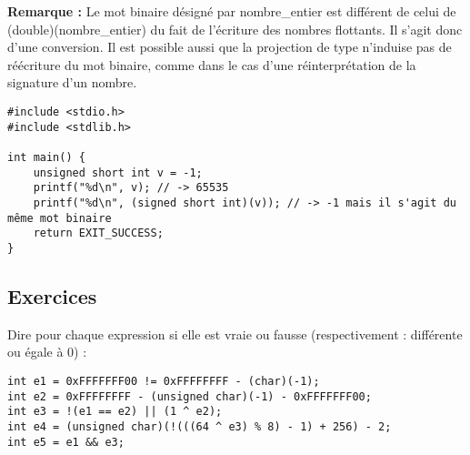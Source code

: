 \documentclass[../../../main.tex]{subfiles}
\begin{document}
\textbf{Remarque :} Le mot binaire désigné par \textsf{nombre\_entier} est différent de celui de \textsf{(double)(nombre\_entier)} du fait de l'écriture des nombres flottants. Il s'agit donc d'une conversion. Il est possible aussi que la projection de type n'induise pas de réécriture du mot binaire, comme dans le cas d'une réinterprétation de la signature d'un nombre. 
\begin{verbatim}
#include <stdio.h>
#include <stdlib.h>

int main() {
	unsigned short int v = -1;
	printf("%d\n", v); // -> 65535
	printf("%d\n", (signed short int)(v)); // -> -1 mais il s'agit du même mot binaire
	return EXIT_SUCCESS;
}
\end{verbatim}
\subsection{Exercices}
\newline
Dire pour chaque expression si elle est vraie ou fausse (respectivement : différente ou égale à 0) :
\begin{verbatim}
int e1 = 0xFFFFFFF00 != 0xFFFFFFFF - (char)(-1);
int e2 = 0xFFFFFFFF - (unsigned char)(-1) - 0xFFFFFFF00;
int e3 = !(e1 == e2) || (1 ^ e2);
int e4 = (unsigned char)(!(((64 ^ e3) % 8) - 1) + 256) - 2;
int e5 = e1 && e3;
\end{verbatim}
\end{document}
